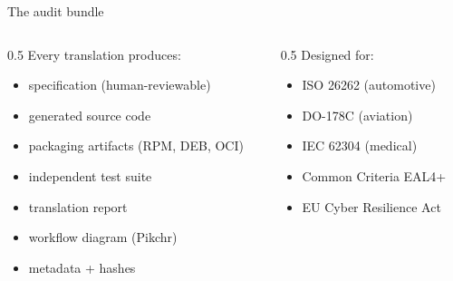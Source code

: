 \documentclass[
  10pt,
  ignorenonframetext,
  aspectratio=169,
  10pt]{beamer}
\providecommand{\tightlist}{%
  \setlength{\itemsep}{0pt}\setlength{\parskip}{0pt}}
\begin{document}
\begin{frame}{The audit bundle}
\protect\hypertarget{the-audit-bundle}{}
\begin{columns}[T]
\begin{column}{0.5\textwidth}
Every translation produces:

\begin{itemize}
\tightlist
\item
  specification (human-reviewable)
\item
  generated source code
\item
  packaging artifacts (RPM, DEB, OCI)
\item
  independent test suite
\item
  translation report
\item
  workflow diagram (Pikchr)
\item
  metadata + hashes
\end{itemize}
\end{column}

\begin{column}{0.5\textwidth}
Designed for:

\begin{itemize}
\tightlist
\item
  ISO 26262 (automotive)
\item
  DO-178C (aviation)
\item
  IEC 62304 (medical)
\item
  Common Criteria EAL4+
\item
  EU Cyber Resilience Act
\end{itemize}
\end{column}
\end{columns}
\end{frame}
\end{document}
